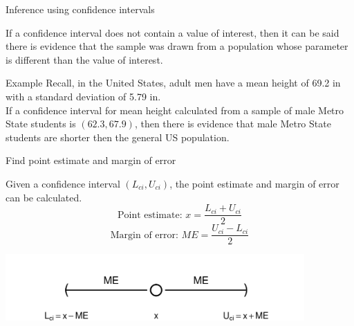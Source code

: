 \documentclass[xcolor=table, handout]{beamer}
\begin{document}
\begin{frame}{Inference using confidence intervals}
\begin{block}{}
\large
If a confidence interval does not contain a value of interest, then it can be said there is evidence that the sample was drawn from a population whose parameter is different than the value of interest.
\end{block}

\pause
\begin{exampleblock}{Example}
Recall, in the United States, adult men have a mean height of 69.2 in with a standard deviation of 5.79 in. \\
\medskip
If a confidence interval for mean height calculated from a sample of male Metro State students is $(62.3, 67.9)$, then there is evidence that male Metro State students are shorter then the general US population.
\end{exampleblock}
\end{frame}

\begin{frame}{Find point estimate and margin of error}
\begin{block}{}
\large
Given a confidence interval $(L_{ci}, U_{ci})$, the point estimate and margin of error can be calculated.
\[\text{Point estimate: } x = \frac {L_{ci} + U_{ci}}{2}\]
\[\text{Margin of error: } ME = \frac {U_{ci} - L_{ci}}{2}\]
\end{block}

\medskip
{\centering
\includegraphics[width=4.5in]{../images/ch7_ci_numline}
\par}

\end{frame}
\end{document}
